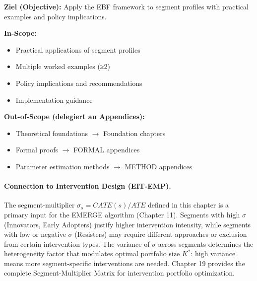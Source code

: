 \begin{tcolorbox}[
    colback=purple!5!white,
    colframe=purple!75!black,
    title={\textbf{Chapter Scope: Ziel / In-Scope / Out-of-Scope}},
    fonttitle=\bfseries
]

\textbf{Ziel (Objective):}
Apply the EBF framework to segment profiles with practical examples and policy implications.

\vspace{0.3cm}
\textbf{In-Scope:}
\begin{itemize}[nosep]
    \item Practical applications of segment profiles
    \item Multiple worked examples (≥2)
    \item Policy implications and recommendations
    \item Implementation guidance
\end{itemize}

\vspace{0.3cm}
\textbf{Out-of-Scope (delegiert an Appendices):}
\begin{itemize}[nosep]
    \item Theoretical foundations $\rightarrow$ Foundation chapters
    \item Formal proofs $\rightarrow$ FORMAL appendices
    \item Parameter estimation methods $\rightarrow$ METHOD appendices
\end{itemize}

\end{tcolorbox}

\paragraph{Connection to Intervention Design (EIT-EMP).}
The segment-multiplier $\sigma_s = CATE(s)/ATE$ defined in this chapter is a primary input
for the EMERGE algorithm (Chapter 11). Segments with high $\sigma$ (Innovators, Early Adopters)
justify higher intervention intensity, while segments with low or negative $\sigma$ (Resisters)
may require different approaches or exclusion from certain intervention types. The variance
of $\sigma$ across segments determines the heterogeneity factor that modulates optimal
portfolio size $K^*$: high variance means more segment-specific interventions are needed.
Chapter 19 provides the complete Segment-Multiplier Matrix for intervention portfolio optimization.


